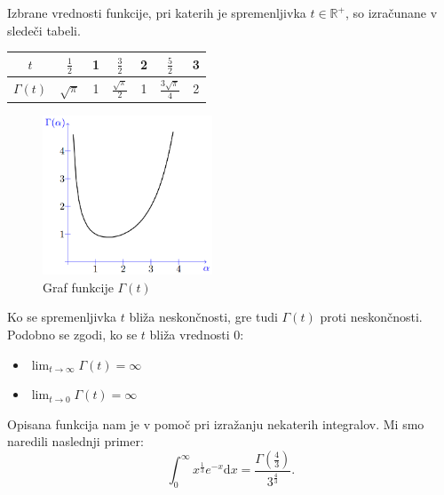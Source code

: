 \documentclass[12pt, a4paper]{article}
\begin{document}
Izbrane vrednosti funkcije, pri katerih je spremenljivka $t \in \mathbb{R^{+}}$, so izračunane v sledeči tabeli.

\begin{center}
\begin{tabular}{| c || c | c | c | c | c | c |}
\hline
$t$ & $\frac{1}{2}$ & 1 & $\frac{3}{2}$ & 2 & $\frac{5}{2}$ & 3 \\
\hline
$\Gamma (t)$ & $\sqrt{\pi}$ & 1 & $\frac{\sqrt{\pi}}{2}$ & 1 & $\frac{3 \sqrt{\pi}}{4}$ & 2 \\
\hline
\end{tabular}
\end{center}

\begin{figure}[h!]
\centering
\includegraphics[width=0.45\textwidth]{gama.png}
\caption{Graf funkcije $ \Gamma (t) $}
\end{figure}

Ko se spremenljivka $t$ bliža neskončnosti, gre tudi $ \Gamma (t)$ proti neskončnosti. Podobno se zgodi, ko se $t$ bliža vrednosti 0:
\begin{itemize}

\item $ \lim_{t \to \infty} \Gamma (t)= \infty $
\item $ \lim_{t \to 0} \Gamma (t)= \infty $
\end{itemize}

Opisana funkcija nam je v pomoč pri izražanju nekaterih integralov. Mi smo naredili naslednji primer:
\[ \int^{\infty}_{0} x^{\frac{1}{3}} e^{-x}\mathrm{d} x = \frac{\Gamma (\frac{4}{3})}{3^{\frac{4}{3}}}. \]














\end{document}
